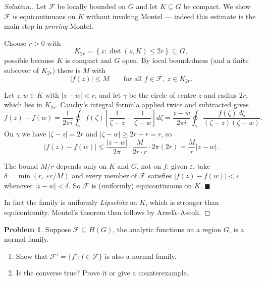 \documentclass[11pt,a4paper]{article}
\theoremstyle{definition}
\newtheorem{problemx}{Problem}[section]
\newenvironment{problem}{\begin{problemx}}{\end{problemx}}
\newenvironment{solution}
  {\renewcommand{\qedsymbol}{}\begin{proof}[\textit{Solution}.]}
  {\end{proof}}
\begin{document}
\begin{solution}
Let $\mathcal{F}$ be locally bounded on $G$ and let $K \subseteq G$ be compact. We
show $\mathcal{F}$ is equicontinuous on $K$ without invoking Montel --- indeed this
estimate is the main step in \emph{proving} Montel.

Choose $r > 0$ with
$$K_{2r} = \left\{z : \operatorname{dist}(z,K) \leq 2r\right\} \subseteq G,$$
possible because $K$ is compact and $G$ open. By local boundedness (and a finite
subcover of $K_{2r}$) there is $M$ with
$$\left|f(z)\right| \leq M \qquad\text{for all } f \in \mathcal{F},\ z \in K_{2r}.$$

Let $z, w \in K$ with $\left|z-w\right| < r$, and let $\gamma$ be the circle of
centre $z$ and radius $2r$, which lies in $K_{2r}$. Cauchy's integral formula
applied twice and subtracted gives
$$f(z)-f(w) = \frac{1}{2\pi i}\oint_{\gamma}
f(\zeta)\left[\frac{1}{\zeta-z}-\frac{1}{\zeta-w}\right]d\zeta
= \frac{z-w}{2\pi i}\oint_{\gamma}
\frac{f(\zeta)\,d\zeta}{(\zeta-z)(\zeta-w)} .$$
On $\gamma$ we have $\left|\zeta - z\right| = 2r$ and
$\left|\zeta-w\right| \geq 2r - r = r$, so
$$\left|f(z)-f(w)\right|
\leq \frac{\left|z-w\right|}{2\pi}\cdot\frac{M}{2r\cdot r}\cdot 2\pi(2r)
= \frac{M}{r}\left|z-w\right| .$$

The bound $M/r$ depends only on $K$ and $G$, not on $f$: given $\varepsilon$, take
$\delta = \min\left(r,\ \varepsilon r/M\right)$ and every member of $\mathcal{F}$
satisfies $\left|f(z)-f(w)\right| < \varepsilon$ whenever
$\left|z-w\right| < \delta$. So $\mathcal{F}$ is (uniformly) equicontinuous on
$K$. $\blacksquare$

In fact the family is uniformly \emph{Lipschitz} on $K$, which is stronger than
equicontinuity. Montel's theorem then follows by Arzel\`a--Ascoli.
\end{solution}


\begin{problem}
Suppose $\mathcal{F} \subseteq H(G)$, the analytic functions on a region $G$, is
a normal family.
\begin{enumerate}
\item[(a).] Show that $\mathcal{F}' = \{f' : f \in \mathcal{F}\}$ is also a
normal family.
\item[(b).] Is the converse true? Prove it or give a counterexample.
\end{enumerate}
\end{problem}
\end{document}
